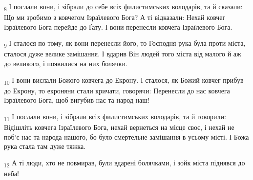\begin{tcolorbox}
\textsubscript{8} І послали вони, і зібрали до себе всіх филистимських володарів, та й сказали: Що ми зробимо з ковчегом Ізраїлевого Бога? А ті відказали: Нехай ковчег Ізраїлевого Бога перейде до Ґату. І вони перенесли ковчега Ізраїлевого Бога.
\end{tcolorbox}
\begin{tcolorbox}
\textsubscript{9} І сталося по тому, як вони перенесли його, то Господня рука була проти міста, сталося дуже велике замішання. І вдарив Він людей того міста від малого й аж до великого, і появилися на них болячки.
\end{tcolorbox}
\begin{tcolorbox}
\textsubscript{10} І вони вислали Божого ковчега до Екрону. І сталося, як Божий ковчег прибув до Екрону, то екроняни стали кричати, говорячи: Перенесли до нас ковчега Ізраїлевого Бога, щоб вигубив нас та народ наш!
\end{tcolorbox}
\begin{tcolorbox}
\textsubscript{11} І послали вони, і зібрали всіх филистимських володарів, та й говорили: Відішліть ковчега Ізраїлевого Бога, нехай вернеться на місце своє, і нехай не поб'є нас та народа нашого, бо було смертельне замішання в усьому місті. І Божа рука стала там дуже тяжка.
\end{tcolorbox}
\begin{tcolorbox}
\textsubscript{12} А ті люди, хто не повмирав, були вдарені болячками, і зойк міста піднявся до неба!
\end{tcolorbox}
